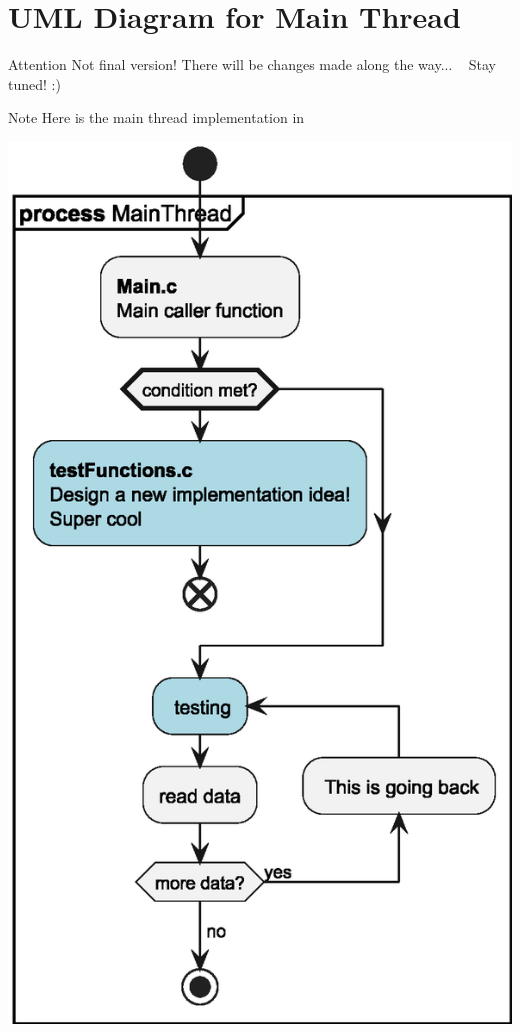 \chapter{UML Diagram for Main Thread}
\hypertarget{_u_m_l__diagram}{}\label{_u_m_l__diagram}
\begin{DoxyAttention}{Attention}
Not final version! There will be changes made along the way... ~\newline
 Stay tuned! \+:)
\end{DoxyAttention}
\begin{DoxyNote}{Note}
Here is the main thread implementation in 
\end{DoxyNote}

\begin{DoxyImageNoCaption}
  \mbox{\includegraphics[width=\textwidth,height=\textheight/2,keepaspectratio=true]{inline_umlgraph_2}}
\end{DoxyImageNoCaption}
 